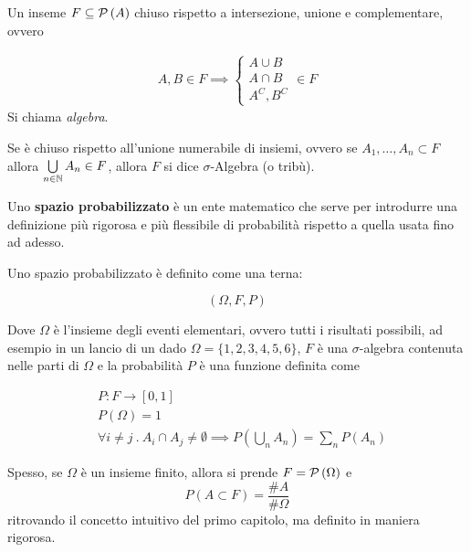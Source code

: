 \begin{defn}
	Un inseme	$ F \subseteq \mathcal{P}\left(A\right) $ chiuso rispetto a intersezione, unione e complementare, ovvero

	\begin{equation*}
	\begin{aligned}
		A,B \in F \implies \begin{cases}
			A \cup B \\
			A \cap B \\
			A^C, B^C
		\end{cases} \in F
	\end{aligned}
	\end{equation*}
	Si chiama {\em algebra}.

	Se \`e chiuso rispetto all'unione numerabile di insiemi, ovvero se $ A_1, \dots, A_n \subset F $ allora $ \bigcup\limits_{n \in \mathbb{N}} A_n \in F $, allora $ F $  si dice  $ \sigma $-Algebra (o trib\`u).
\end{defn}
Uno \textbf{spazio probabilizzato} \`e un ente matematico che serve per introdurre una definizione pi\`u rigorosa e pi\`u flessibile di probabilit\`a rispetto a quella usata fino ad adesso.
\begin{defn}
	 Uno spazio probabilizzato \`e definito come una terna:

	\begin{equation}
		(\Omega, F, P)
	\end{equation}

	Dove $ \Omega $ \`e l'insieme degli eventi elementari, ovvero tutti i risultati possibili, ad esempio in un lancio di un dado $ \Omega = \{1,2,3,4,5,6\} $, $F$ \`e una $\sigma$-algebra contenuta nelle parti di $\Omega$ e 
	la probabilit\`a $ P $ \`e una funzione definita come

	\begin{eqnarray}
			&P : F \to [0,1] \nonumber\\
			&P(\Omega) = 1 \\
			&\forall i \neq j \> . \> A_i \cap A_j \neq \emptyset \implies P \left( \bigcup\limits_{n} A_n \right) = \sum_{n} P(A_n)\nonumber
	\end{eqnarray}
\end{defn}

Spesso, se $ \Omega $ \`e un insieme finito, allora si prende $ F = \mathcal{P}\left(\Omega\right) $ e
	\begin{equation*}
		P (A \subset F) = \dfrac{\#A}{\#\Omega}
	\end{equation*}
	ritrovando il concetto intuitivo del primo capitolo, ma definito in maniera rigorosa.

